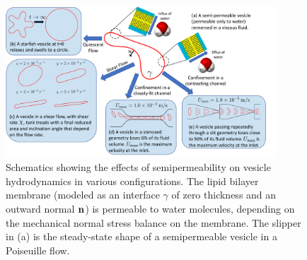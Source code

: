 \documentclass[prb,preprint,showpacs,preprintnumbers,amsmath,amssymb,longbibliography]{revtex4-1}
\begin{document}


%
\begin{figure}[htp]
  \centering
  \includegraphics[width=0.9\textwidth]{figures/schematic.pdf}
  \caption{\label{fig:sketch} Schematics showing the effects of
  semipermeability on vesicle hydrodynamics in various configurations. 
  The lipid bilayer membrane (modeled as an interface $\gamma$ of zero
  thickness and an outward normal $\mathbf{n}$) is permeable to water
  molecules, depending on the mechanical normal stress balance on the
  membrane.  The slipper in (a) is the steady-state shape of a
  semipermeable vesicle in a Poiseuille flow.}
\end{figure}
%
\end{document}
